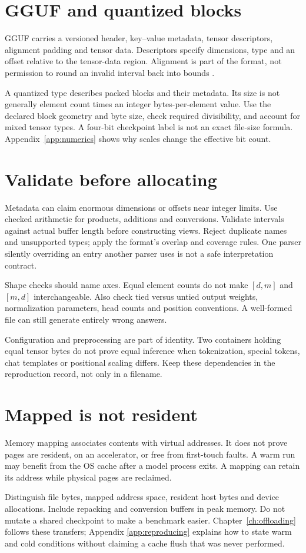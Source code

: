 \section{GGUF and quantized blocks}
GGUF carries a versioned header, key--value metadata, tensor descriptors,
alignment padding and tensor data. Descriptors specify dimensions, type
and an offset relative to the tensor-data region. Alignment is part of
the format, not permission to round an invalid interval back into bounds
\cite{ggml2026gguf}.

A quantized type describes packed blocks and their metadata. Its size is
not generally element count times an integer bytes-per-element value.
Use the declared block geometry and byte size, check required divisibility,
and account for mixed tensor types. A four-bit checkpoint label is not
an exact file-size formula. Appendix~\ref{app:numerics} shows why scales
change the effective bit count.

\section{Validate before allocating}
Metadata can claim enormous dimensions or offsets near integer limits.
Use checked arithmetic for products, additions and conversions. Validate
intervals against actual buffer length before constructing views. Reject
duplicate names and unsupported types; apply the format's overlap and
coverage rules. One parser silently overriding an entry another parser
uses is not a safe interpretation contract.

Shape checks should name axes. Equal element counts do not make
$[d,m]$ and $[m,d]$ interchangeable. Also check tied versus untied output
weights, normalization parameters, head counts and position conventions.
A well-formed file can still generate entirely wrong answers.

Configuration and preprocessing are part of identity. Two containers
holding equal tensor bytes do not prove equal inference when tokenization,
special tokens, chat templates or positional scaling differs. Keep these
dependencies in the reproduction record, not only in a filename.

\section{Mapped is not resident}
Memory mapping associates contents with virtual addresses. It does not
prove pages are resident, on an accelerator, or free from first-touch
faults. A warm run may benefit from the OS cache after a model process
exits. A mapping can retain its address while physical pages are reclaimed.

Distinguish file bytes, mapped address space, resident host bytes and device
allocations. Include repacking and conversion buffers in peak memory.
Do not mutate a shared checkpoint to make a benchmark easier.
Chapter~\ref{ch:offloading} follows these transfers; Appendix
\ref{app:reproducing} explains how to state warm and cold conditions
without claiming a cache flush that was never performed.
